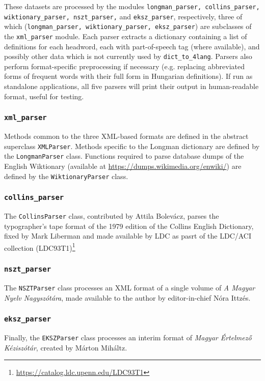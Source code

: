 \documentclass{article}
\newcommand{\difl}{\texttt{dict\_to\_4lang}\xspace}
\begin{document}
These datasets are processed by the modules \texttt{longman\_parser,
collins\_parser, wiktionary\_parser, nszt\_parser,} and \texttt{eksz\_parser},
respectively, three of which (\texttt{longman\_parser, wiktionary\_parser,
eksz\_parser}) are subclasses of the
\texttt{xml\_parser} module. Each parser extracts a dictionary containing a
list of definitions for each headword, each with part-of-speech tag (where
available), and possibly other data which is not currently used by \difl.
Parsers also perform format-specific
preprocessing if necessary (e.g. replacing abbreviated forms of frequent words
with their full form in Hungarian definitions).
If run as standalone applications, all five parsers will print their output in
human-readable format, useful for testing.

\subsubsection{\texttt{xml\_parser}}
Methods common to the three XML-based formats are defined in the abstract superclass \texttt{XMLParser}.
Methods specific to the Longman dictionary are defined by the \texttt{LongmanParser} class.
Functions required to parse database dumps of the English Wiktionary
(available at \url{https://dumps.wikimedia.org/enwiki/}) are defined by the \texttt{WiktionaryParser} class.

\subsubsection{\texttt{collins\_parser}}
The \texttt{CollinsParser} class, contributed by Attila Bolev\'acz, parses the
typographer's tape format of the 1979 edition of the Collins English Dictionary,
fixed by Mark Liberman and made available by LDC as pasrt of the LDC/ACI collection (LDC93T1)\footnote{\url{https://catalog.ldc.upenn.edu/LDC93T1}}

\subsubsection{\texttt{nszt\_parser}}
The \texttt{NSZTParser} class processes an XML format of a single volume
of \textit{A Magyar Nyelv Nagysz\'ot\'ara}, made available to the author by editor-in-chief N\'ora Ittz\'es.

\subsubsection{\texttt{eksz\_parser}}
Finally, the \texttt{EKSZParser} class processes an interim format of \textit{Magyar \'Ertelmez\H o K\'ezisz\'ot\'ar}, created by M\'arton Mih\'altz.
\end{document}
